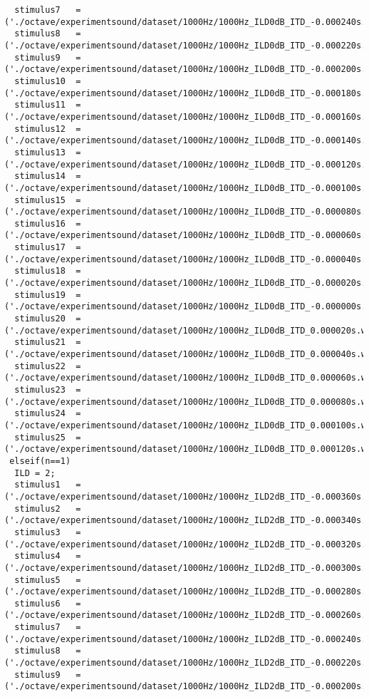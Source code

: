 {\begin{verbatim}
  stimulus7   =('./octave/experimentsound/dataset/1000Hz/1000Hz_ILD0dB_ITD_-0.000240s.wav');
  stimulus8   =('./octave/experimentsound/dataset/1000Hz/1000Hz_ILD0dB_ITD_-0.000220s.wav');
  stimulus9   =('./octave/experimentsound/dataset/1000Hz/1000Hz_ILD0dB_ITD_-0.000200s.wav');
  stimulus10  =('./octave/experimentsound/dataset/1000Hz/1000Hz_ILD0dB_ITD_-0.000180s.wav');
  stimulus11  =('./octave/experimentsound/dataset/1000Hz/1000Hz_ILD0dB_ITD_-0.000160s.wav');
  stimulus12  =('./octave/experimentsound/dataset/1000Hz/1000Hz_ILD0dB_ITD_-0.000140s.wav');
  stimulus13  =('./octave/experimentsound/dataset/1000Hz/1000Hz_ILD0dB_ITD_-0.000120s.wav');
  stimulus14  =('./octave/experimentsound/dataset/1000Hz/1000Hz_ILD0dB_ITD_-0.000100s.wav');
  stimulus15  =('./octave/experimentsound/dataset/1000Hz/1000Hz_ILD0dB_ITD_-0.000080s.wav');
  stimulus16  =('./octave/experimentsound/dataset/1000Hz/1000Hz_ILD0dB_ITD_-0.000060s.wav');
  stimulus17  =('./octave/experimentsound/dataset/1000Hz/1000Hz_ILD0dB_ITD_-0.000040s.wav');
  stimulus18  =('./octave/experimentsound/dataset/1000Hz/1000Hz_ILD0dB_ITD_-0.000020s.wav');
  stimulus19  =('./octave/experimentsound/dataset/1000Hz/1000Hz_ILD0dB_ITD_-0.000000s.wav');
  stimulus20  =('./octave/experimentsound/dataset/1000Hz/1000Hz_ILD0dB_ITD_0.000020s.wav');
  stimulus21  =('./octave/experimentsound/dataset/1000Hz/1000Hz_ILD0dB_ITD_0.000040s.wav');
  stimulus22  =('./octave/experimentsound/dataset/1000Hz/1000Hz_ILD0dB_ITD_0.000060s.wav');
  stimulus23  =('./octave/experimentsound/dataset/1000Hz/1000Hz_ILD0dB_ITD_0.000080s.wav');
  stimulus24  =('./octave/experimentsound/dataset/1000Hz/1000Hz_ILD0dB_ITD_0.000100s.wav');
  stimulus25  =('./octave/experimentsound/dataset/1000Hz/1000Hz_ILD0dB_ITD_0.000120s.wav');
 elseif(n==1)
  ILD = 2;
  stimulus1   =('./octave/experimentsound/dataset/1000Hz/1000Hz_ILD2dB_ITD_-0.000360s.wav');
  stimulus2   =('./octave/experimentsound/dataset/1000Hz/1000Hz_ILD2dB_ITD_-0.000340s.wav');
  stimulus3   =('./octave/experimentsound/dataset/1000Hz/1000Hz_ILD2dB_ITD_-0.000320s.wav');
  stimulus4   =('./octave/experimentsound/dataset/1000Hz/1000Hz_ILD2dB_ITD_-0.000300s.wav');
  stimulus5   =('./octave/experimentsound/dataset/1000Hz/1000Hz_ILD2dB_ITD_-0.000280s.wav');
  stimulus6   =('./octave/experimentsound/dataset/1000Hz/1000Hz_ILD2dB_ITD_-0.000260s.wav');
  stimulus7   =('./octave/experimentsound/dataset/1000Hz/1000Hz_ILD2dB_ITD_-0.000240s.wav');
  stimulus8   =('./octave/experimentsound/dataset/1000Hz/1000Hz_ILD2dB_ITD_-0.000220s.wav');
  stimulus9   =('./octave/experimentsound/dataset/1000Hz/1000Hz_ILD2dB_ITD_-0.000200s.wav');

\end{verbatim}}
